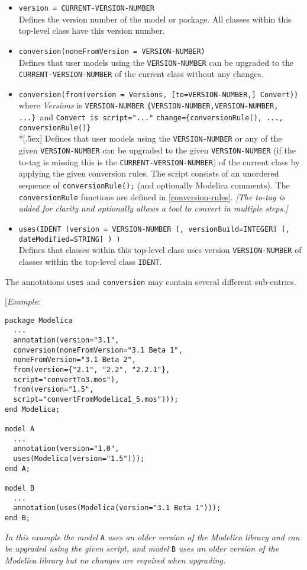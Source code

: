 \begin{itemize}
\item
  \lstinline!version = CURRENT-VERSION-NUMBER!\\
  Defines the version number of the model or package. All classes within
  this top-level class have this version number.
\item
  \lstinline!conversion(noneFromVersion = VERSION-NUMBER)!\\
  Defines that user models using the \lstinline!VERSION-NUMBER! can be upgraded to
  the \lstinline!CURRENT-VERSION-NUMBER! of the current class without any changes.
\item
  \lstinline!conversion(from(version = Versions, [to=VERSION-NUMBER,] Convert))!\\
  where \emph{Versions} is \lstinline!VERSION-NUMBER! \textbar{}
   \lstinline!{VERSION-NUMBER,VERSION-NUMBER, ...}!\
  and \lstinline!Convert is script="..."! \textbar{}
   \lstinline!change={conversionRule(), ..., conversionRule()}!\\*[.5ex]
  Defines that user models using the \lstinline!VERSION-NUMBER! or any of the given
  \lstinline!VERSION-NUMBER! can be upgraded to the given \lstinline!VERSION-NUMBER! (if the
  to-tag is missing this is the \lstinline!CURRENT-VERSION-NUMBER!) of the current
  class by applying the given conversion rules. The script consists of
  an unordered sequence of  \lstinline!conversionRule();! (and optionally Modelica
  comments). The  \lstinline!conversionRule! functions are defined in \autoref{conversion-rules}.
  \emph{{[}The to-tag is added for clarity and optionally allows a tool
  to convert in multiple steps.{]}}
\item
  \lstinline!uses(IDENT (version = VERSION-NUMBER [, versionBuild=INTEGER] [, dateModified=STRING] ) )!\\
  Defines that classes within this top-level class uses version
  \lstinline!VERSION-NUMBER! of classes within the top-level class \lstinline!IDENT!.
\end{itemize}

The annotations \lstinline!uses! and \lstinline!conversion! may contain several different
sub-entries.

{[}\emph{Example}:

\begin{lstlisting}[language=modelica]
package Modelica
  ...
  annotation(version="3.1",
  conversion(noneFromVersion="3.1 Beta 1",
  noneFromVersion="3.1 Beta 2",
  from(version={"2.1", "2.2", "2.2.1"},
  script="convertTo3.mos"),
  from(version="1.5",
  script="convertFromModelica1_5.mos")));
end Modelica;

model A
  ...
  annotation(version="1.0",
  uses(Modelica(version="1.5")));
end A;

model B
  ...
  annotation(uses(Modelica(version="3.1 Beta 1")));
end B;
\end{lstlisting}
\emph{In this example the model} \lstinline!A! \emph{uses an older version of the
Modelica library and can be upgraded using the given script, and model}
\lstinline!B! \emph{uses an older version of the Modelica library but no changes are
required when upgrading. }

